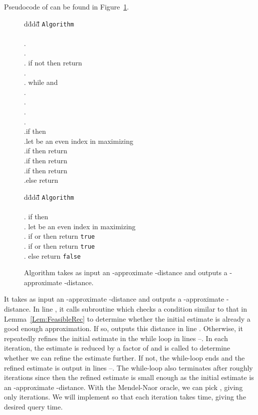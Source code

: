 \documentclass[11pt]{article}
\begin{document}
Pseudocode of  can be found in Figure~\ref{fig:refine}.
\begin{figure}
\begin{tabbing}
d\=ddd\=\quad\=\quad\=\quad\=\quad\=\quad\=\quad\=\quad\=\quad\=\quad\=\quad\=\quad\=\kill
\>\texttt{Algorithm} \\\\
. \>\\
. \>\\
. \>if not  then return \\
. \>\\
. \>while  and
       \\
. \>\>\\
. \>\>\\
. \>\>\\
. \>\\
.\>if  then\\
.\>\>let  be an even index in 
         maximizing \\
.\>\>if  then
         return \\
.\>\>if  then
         return \\
.\>if  then
       return \\
.\>else return \\
\end{tabbing}
\begin{tabbing}
d\=ddd\=\quad\=\quad\=\quad\=\quad\=\quad\=\quad\=\quad\=\quad\=\quad\=\quad\=\quad\=\kill
\>\texttt{Algorithm} \\\\
. \>if  then\\
. \>\>let  be an even index in 
         maximizing \\
. \>\>if  or  then
         return \texttt{true}\\
. \>if  or  then
       return \texttt{true}\\
. \>else return \texttt{false}\\
\end{tabbing}
\caption{Algorithm  takes as input an -approximate -distance  and outputs
         a -approximate -distance.}\label{fig:refine}
\end{figure}
It takes as input an -approximate -distance  and outputs
a -approximate -distance. In line , it calls
subroutine  which checks a condition similar to that in Lemma~\ref{Lem:FeasibleRec}
to determine whether the initial estimate  is already a good enough approximation.
If so,  outputs this distance in line . Otherwise, it repeatedly refines the initial
estimate in the while loop in lines --. In each iteration, the estimate is reduced by a
factor of  and  is called to determine whether we can refine the
estimate further. If not, the while-loop ends and the refined estimate is output in lines
--. The while-loop also terminates after roughly  iterations since
then the refined estimate is small enough as the initial estimate is an -approximate
-distance. With the Mendel-Naor oracle, we can pick , giving only 
iterations. We will implement  so that each iteration takes  time, giving the
desired  query time.
\end{document}
